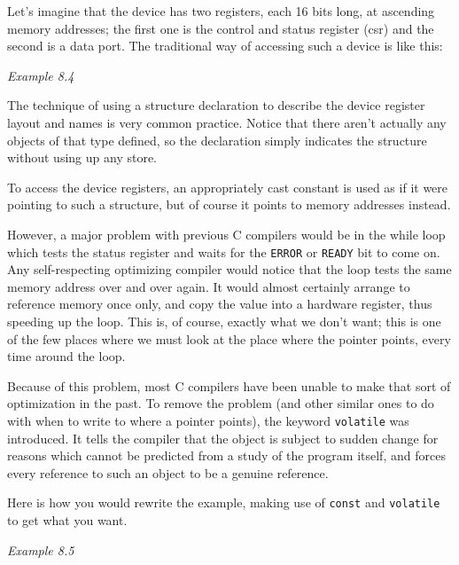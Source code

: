    Let's imagine that the device has two registers, each 16 bits long, at
    ascending memory addresses; the first one is the control and status
    register (csr) and the second is a data port. The traditional way of
    accessing such a device is like this:


\begin{center}\textit{Example 8.4}\end{center}


   The technique of using a structure declaration to describe the device
    register layout and names is very common practice. Notice that there
    aren't actually any objects of that type defined, so the declaration
    simply indicates the structure without using up any store.


   To access the device registers, an appropriately cast constant is used
    as if it were pointing to such a structure, but of course it points to
    memory addresses instead.


   However, a major problem with previous C compilers would be in the
    while loop which tests the status register and waits for the
    \texttt{ERROR} or \texttt{READY} bit to come on. Any
    self-respecting optimizing compiler would notice that the loop tests the
    same memory address over and over again. It would almost certainly
    arrange to reference memory once only, and copy the value into
    a hardware register, thus speeding up the loop. This is, of course,
    exactly what we don't want; this is one of the few places where we must
    look at the place where the pointer points, every time around the
    loop.


   Because of this problem, most C compilers have been unable to make
    that sort of optimization in the past. To remove the problem (and other
    similar ones to do with when to write to where a pointer points), the
    keyword \texttt{volatile} was introduced. It tells the compiler that
    the object is subject to sudden change for reasons which cannot be
    predicted from a study of the program itself, and forces every reference
    to such an object to be a genuine reference.


   Here is how you would rewrite the example, making use of
    \texttt{const} and \texttt{volatile} to get what you want.


\begin{center}\textit{Example 8.5}\end{center}


